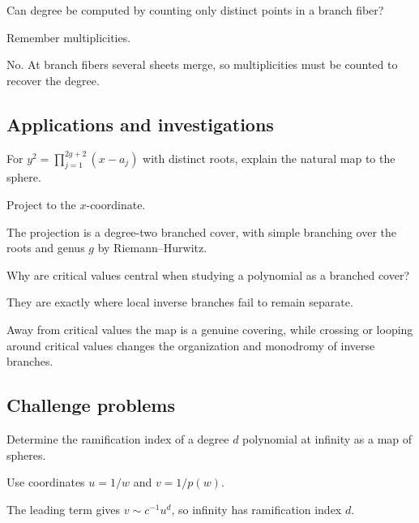 \begin{exercise}\label{exr:iv24-expand-12}
Can degree be computed by counting only distinct points in a branch fiber?
\end{exercise}
\begin{hint}
Remember multiplicities.
\end{hint}
\begin{solution}
No. At branch fibers several sheets merge, so multiplicities must be counted to recover the degree.
\end{solution}

\subsection*{Applications and investigations}

\begin{exercise}\label{exr:iv24-expand-13}
For \(y^2=\prod_{j=1}^{2g+2}(x-a_j)\) with distinct roots, explain the natural map to the sphere.
\end{exercise}
\begin{hint}
Project to the \(x\)-coordinate.
\end{hint}
\begin{solution}
The projection is a degree-two branched cover, with simple branching over the roots and genus \(g\) by Riemann--Hurwitz.
\end{solution}

\begin{exercise}\label{exr:iv24-expand-14}
Why are critical values central when studying a polynomial as a branched cover?
\end{exercise}
\begin{hint}
They are exactly where local inverse branches fail to remain separate.
\end{hint}
\begin{solution}
Away from critical values the map is a genuine covering, while crossing or looping around critical values changes the organization and monodromy of inverse branches.
\end{solution}

\subsection*{Challenge problems}

\begin{exercise}\label{exr:iv24-expand-15}
Determine the ramification index of a degree \(d\) polynomial at infinity as a map of spheres.
\end{exercise}
\begin{hint}
Use coordinates \(u=1/w\) and \(v=1/p(w)\).
\end{hint}
\begin{solution}
The leading term gives \(v\sim c^{-1}u^d\), so infinity has ramification index \(d\).
\end{solution}

